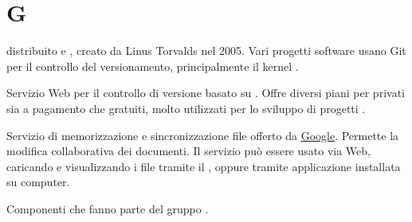\section{G}

 distribuito e , creato da Linus Torvalds nel 2005.
Vari progetti software usano Git per il controllo del versionamento, principalmente il kernel .

Servizio Web per il controllo di versione basato su . Offre diversi piani per  privati sia a pagamento che gratuiti, molto utilizzati per lo sviluppo di progetti .

Servizio  di memorizzazione e sincronizzazione file offerto da \href{https://www.google.it}{Google}. Permette la modifica collaborativa dei documenti. Il servizio può essere usato via Web, caricando e visualizzando i file tramite il , oppure tramite applicazione installata su computer.

Componenti che fanno parte del gruppo \zephyrus.



